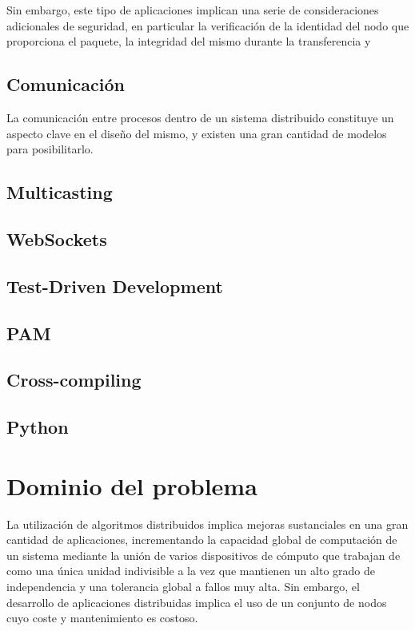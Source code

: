 Sin embargo, este tipo de aplicaciones implican una serie de consideraciones adicionales de seguridad, en particular la verificación de la identidad del nodo que proporciona el paquete, la integridad del mismo durante la transferencia y \citationneeded{}

\section{Comunicación}

La comunicación entre procesos dentro de un sistema distribuido constituye un aspecto clave en el diseño del mismo, y existen una gran cantidad de modelos para posibilitarlo.

\section{Multicasting}

\section{WebSockets}

\section{Test-Driven Development}


\section{PAM}

\section{Cross-compiling}

\section{Python}

\chapter{Dominio del problema}

La utilización de algoritmos distribuidos implica mejoras sustanciales en una gran cantidad de aplicaciones, incrementando la capacidad global de computación de un sistema mediante la unión de varios dispositivos de cómputo que trabajan de como una única unidad indivisible a la vez que mantienen un alto grado de independencia y una tolerancia global a fallos muy alta. Sin embargo, el desarrollo de aplicaciones distribuidas implica el uso de un conjunto de nodos cuyo coste y mantenimiento es costoso.

